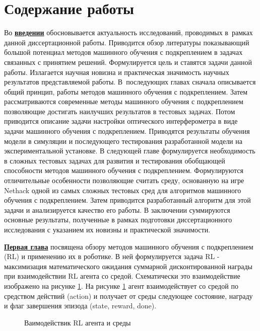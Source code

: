 \section*{Содержание работы}
Во \underline{\textbf{введении}} обосновывается актуальность
исследований, проводимых в~рамках данной диссертационной работы. Приводится обзор литературы показывающий большой потенциал методов машинного обучения с подкреплением в задачах связанных с принятием решений. Формулируется цель и ставятся задачи данной работы. Излагается научная новизна
и практическая значимость научных результатов представляемой работы. 
В~последующих главах сначала описывается общий принцип, работы методов машинного обучения с подкреплением. Затем рассматриваются современные методы машинного обучения с подкреплением позволяющие достигать наилучших результатов в тестовых задачах. Потом приводится описание задачи настройки оптического интерферометра в виде задачи машинного обучения с подкреплением. Приводятся результаты обучения модели в симуляции и последующего тестирования разработанной модели на экспериментальной установке. В следующей главе формулируется необходимость в сложных тестовых задачах для развития и тестирования обобщающей способности методов машинного обучения с подкреплением. Формулируются отличительные особенности позволяющие считать среду, основанную на игре Nethack одной из самых сложных тестовых сред для алгоритмов машинного обучения с подкреплением. Затем приводится разработанный алгоритм для этой задачи и анализируется качество его работы. В заключении суммируются основные результаты, полученные в рамках подготовки диссертационного исследования с указанием их новизны и практической значимости. 


\underline{\textbf{Первая глава}} посвящена обзору методов машинного обучения с подкреплением (RL) и применению их в роботике. В ней формулируется задача RL - максимизация математического ожидания суммарной дисконтированной награды при взаимодействии RL агента со средой. Схематически это взаимодействие изображено на рисунке \ref{fig:rl_setting}. На рисунке \ref{fig:rl_setting} агент взаимодействует со средой по средством действий (action) и получает от среды следующее состояние, награду и флаг завершения эпизода (state, reward, done).

\begin{figure}[ht]
    \caption{Ваимодействик RL агента и среды}\label{fig:rl_setting}
\end{figure}

